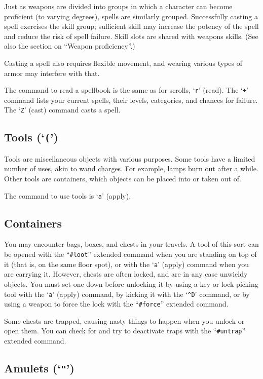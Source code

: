 Just as weapons are divided into groups in which a character can become
proficient (to varying degrees), spells are similarly grouped.
Successfully casting a spell exercises the skill group; sufficient skill
may increase the potency of the spell and reduce the risk of spell failure.
Skill slots are shared with weapons skills.  (See also the section on
``Weapon proficiency''.)

Casting a spell also requires flexible movement, and wearing various types
of armor may interfere with that.

The command to read a spellbook is the same as for scrolls, `{\tt r}'
(read).  The `{\tt +}' command lists your current spells, their levels,
categories, and chances for failure.
The `{\tt Z}' (cast) command casts a spell.

\subsection*{Tools (`{\tt (}')}

Tools are miscellaneous objects with various purposes.  Some tools
have a limited number of uses, akin to wand charges.  For example, lamps burn
out after a while.  Other tools are containers, which objects can
be placed into or taken out of.

The command to use tools is `{\tt a}' (apply).

\subsection*{Containers}

You may encounter bags, boxes, and chests in your travels.  A tool of
this sort can be opened with the ``{\tt \#loot}'' extended command when
you are standing on top of it (that is, on the same floor spot),
or with the `{\tt a}' (apply) command when you are carrying it.  However,
chests are often locked, and are in any case unwieldy objects.
You must set one down before unlocking it by
using a key or lock-picking tool with the `{\tt a}' (apply) command,
by kicking it with the `{\tt \^{}D}' command,
or by using a weapon to force the lock with the ``{\tt \#force}''
extended command.

Some chests are trapped, causing nasty things to happen when you
unlock or open them.  You can check for and try to deactivate traps
with the ``{\tt \#untrap}'' extended command.

\subsection*{Amulets (`{\tt "}')}

